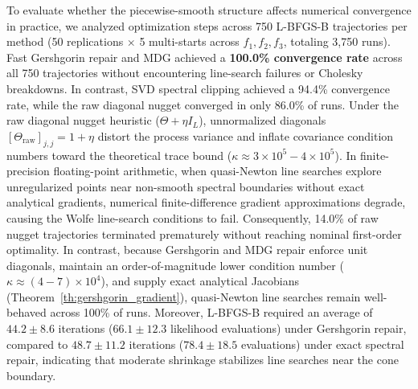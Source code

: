 \documentclass[default,sn-mathphys,Numbered]{sn-jnl}
\theoremstyle{thmstyleone}
\theoremstyle{thmstylethree}
\theoremstyle{thmstyletwo}
\begin{document}
To evaluate whether the piecewise-smooth structure affects numerical convergence in practice, we analyzed optimization steps across 750 L-BFGS-B trajectories per method (50 replications $\times$ 5 multi-starts across $f_1, f_2, f_3$, totaling 3,750 runs). Fast Gershgorin repair and MDG achieved a \textbf{100.0\% convergence rate} across all 750 trajectories without encountering line-search failures or Cholesky breakdowns. In contrast, SVD spectral clipping achieved a 94.4\% convergence rate, while the raw diagonal nugget converged in only 86.0\% of runs. Under the raw diagonal nugget heuristic ($\Theta + \eta I_L$), unnormalized diagonals $[\Theta_{\mathrm{raw}}]_{j, j} = 1 + \eta$ distort the process variance and inflate covariance condition numbers toward the theoretical trace bound ($\kappa \approx 3 \times 10^5 - 4 \times 10^5$). In finite-precision floating-point arithmetic, when quasi-Newton line searches explore unregularized points near non-smooth spectral boundaries without exact analytical gradients, numerical finite-difference gradient approximations degrade, causing the Wolfe line-search conditions to fail.
Consequently, 14.0\% of raw nugget trajectories terminated prematurely without reaching nominal first-order optimality. In contrast, because Gershgorin and MDG repair enforce unit diagonals, maintain an order-of-magnitude lower condition number ($\kappa \approx (4 - 7) \times 10^4$), and supply exact analytical Jacobians (Theorem~\ref{th:gershgorin_gradient}), quasi-Newton line searches remain well-behaved across 100\% of runs. Moreover, L-BFGS-B required an average of $44.2 \pm 8.6$ iterations ($66.1 \pm 12.3$ likelihood evaluations) under Gershgorin repair, compared to $48.7 \pm 11.2$ iterations ($78.4 \pm 18.5$ evaluations) under exact spectral repair, indicating that moderate shrinkage stabilizes line searches near the cone boundary.
\end{document}
